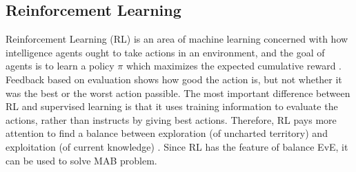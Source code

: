 \documentclass[journal]{IEEEtran}
\begin{document}
\subsection{Reinforcement Learning}
Reinforcement Learning (RL) \cite{sutton2018reinforcement} is an area of machine learning concerned with how intelligence agents ought to take actions in an environment, and the goal of agents is to learn a policy $\pi$ which maximizes the expected cumulative reward \cite{van2012reinforcement}.
Feedback based on evaluation shows how good the action is, but not whether it was the best or the worst action passible.
The most important difference between RL and supervised learning is that it uses training information to evaluate the actions, rather than instructs by giving best actions.
Therefore, RL pays more attention to find a balance between exploration (of uncharted territory) and exploitation (of current knowledge) \cite{kaelbling1996reinforcement}.
Since RL has the feature of balance EvE, it can be used to solve MAB problem.
\end{document}

